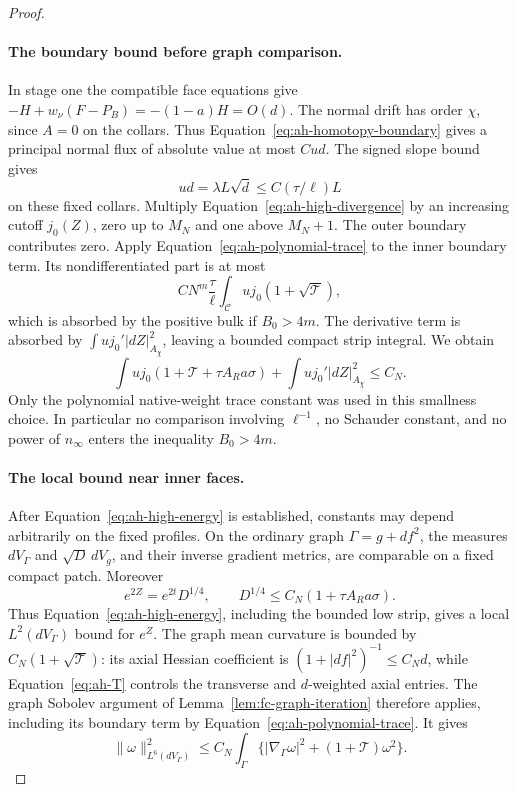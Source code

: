 \begin{proof}
\paragraph{The boundary bound before graph comparison.}
In stage one the compatible face equations give
\(-H+w_\nu(F-P_B)=-(1-a)H=O(d)\).
The normal drift has order \(\chi\), since \(A=0\) on the collars.
Thus Equation~\eqref{eq:ah-homotopy-boundary} gives a principal
normal flux of absolute value at most \(Cud\).
The signed slope bound gives
\[
 ud=\lambda L\sqrt d\le C(\tau/\ell)L
\]
on these fixed collars. Multiply
Equation~\eqref{eq:ah-high-divergence} by an increasing cutoff
\(j_0(Z)\), zero up to \(M_N\) and one above \(M_N+1\).
The outer boundary contributes zero. Apply
Equation~\eqref{eq:ah-polynomial-trace} to the inner boundary
term. Its nondifferentiated part is at most
\[
 CN^m\frac{\tau}{\ell}
 \int_{\mathcal C}u j_0(1+\sqrt{\mathcal T}),
\]
which is absorbed by the positive bulk if \(B_0>4m\).
The derivative term is absorbed by
\(\int u j_0'|dZ|_{A_\chi}^2\), leaving a bounded compact strip
integral. We obtain
\begin{equation}\label{eq:ah-high-energy}
 \int u j_0(1+\mathcal T+\tau A_Ra\sigma)
       +\int u j_0'|dZ|_{A_\chi}^2\le C_N .
\end{equation}
Only the polynomial native-weight trace constant was used in
this smallness choice. In particular no comparison involving
\(\ell^{-1}\), no Schauder constant, and no power of
\(n_\infty\) enters the inequality \(B_0>4m\).

\paragraph{The local bound near inner faces.}
After Equation~\eqref{eq:ah-high-energy} is established, constants
may depend arbitrarily on the fixed profiles.
On the ordinary graph \(\Gamma=g+df^2\), the measures
\(dV_\Gamma\) and \(\sqrt D\,dV_g\), and their inverse gradient
metrics, are comparable on a fixed compact patch. Moreover
\[
 e^{2Z}=e^{2t}D^{1/4},\qquad
 D^{1/4}\le C_N(1+\tau A_Ra\sigma).
\]
Thus Equation~\eqref{eq:ah-high-energy}, including the bounded
low strip, gives a local \(L^2(dV_\Gamma)\) bound for \(e^Z\).
The graph mean curvature is bounded by
\(C_N(1+\sqrt{\mathcal T})\): its axial Hessian coefficient is
\((1+|df|^2)^{-1}\le C_Nd\), while Equation~\eqref{eq:ah-T}
controls the transverse and \(d\)-weighted axial entries.
The graph Sobolev argument of Lemma~\ref{lem:fc-graph-iteration}
therefore applies, including its boundary term by
Equation~\eqref{eq:ah-polynomial-trace}. It gives
\[
 \|\omega\|_{L^6(dV_\Gamma)}^2
 \le C_N\int_\Gamma
 \{|\nabla_\Gamma\omega|^2+(1+\mathcal T)\omega^2\}.
\]


\end{proof}
